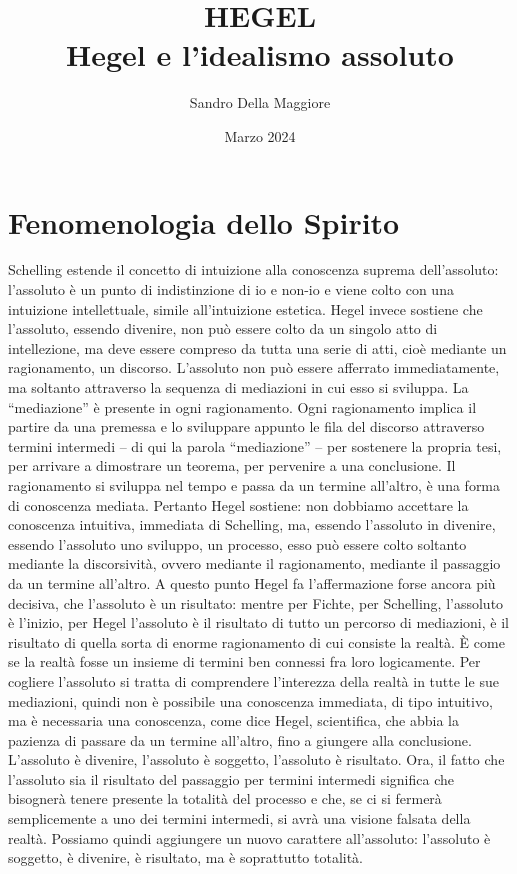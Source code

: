 \documentclass[a4paper,12pt,oneside,openany]{book}%
\begin{document}
	\author{Sandro Della Maggiore}
	\title{\Huge HEGEL\\{\Large Hegel e l'idealismo assoluto}}
	\date{Marzo 2024}
	\maketitle
	\section*{Fenomenologia dello Spirito }
	
Schelling estende il concetto di intuizione alla conoscenza suprema dell’assoluto: l’assoluto è un punto di indistinzione di io e non-io e viene colto con una intuizione intellettuale, simile all’intuizione estetica. Hegel invece sostiene che l’assoluto, essendo divenire, non può essere colto da un singolo atto di intellezione, ma deve essere compreso da tutta una serie di atti, cioè mediante un ragionamento, un discorso. L’assoluto non può essere afferrato immediatamente, ma soltanto attraverso la sequenza di mediazioni in cui esso si sviluppa. La “mediazione” è presente in ogni ragionamento. Ogni ragionamento implica il partire da una premessa e lo sviluppare appunto le fila del discorso attraverso termini intermedi – di qui la parola
“mediazione” – per sostenere la propria tesi, per arrivare a dimostrare un teorema, per pervenire a una conclusione. Il ragionamento si sviluppa nel tempo e passa da un termine all’altro, è una forma di conoscenza mediata. Pertanto Hegel sostiene: non dobbiamo accettare la conoscenza intuitiva, immediata di Schelling, ma, essendo l’assoluto in divenire, essendo l’assoluto uno sviluppo, un processo, esso può essere colto soltanto mediante la discorsività, ovvero mediante il ragionamento, mediante il passaggio da un termine all’altro. A questo punto Hegel fa l’affermazione forse ancora più decisiva, che l’assoluto è un risultato: mentre per Fichte, per Schelling, l’assoluto è l’inizio, per Hegel l’assoluto è il risultato di tutto un percorso di mediazioni, è il risultato di quella sorta di enorme ragionamento di cui consiste la realtà. È come se la realtà fosse un insieme di termini ben connessi fra loro logicamente. Per cogliere l’assoluto si tratta di comprendere l’interezza della realtà in tutte le sue mediazioni, quindi non è possibile una conoscenza immediata, di tipo intuitivo, ma è necessaria una conoscenza, come dice Hegel, scientifica, che abbia la pazienza di passare da un termine all’altro, fino a giungere alla conclusione. L’assoluto è divenire, l’assoluto è soggetto, l’assoluto è risultato. Ora, il fatto che l’assoluto sia il risultato del passaggio per termini intermedi significa che bisognerà tenere presente la totalità del processo e che, se ci si fermerà semplicemente a uno dei termini intermedi, si avrà una visione falsata della realtà. Possiamo quindi aggiungere un nuovo carattere all’assoluto: l’assoluto è soggetto, è divenire, è risultato, ma è soprattutto totalità.	
	
\end{document}
